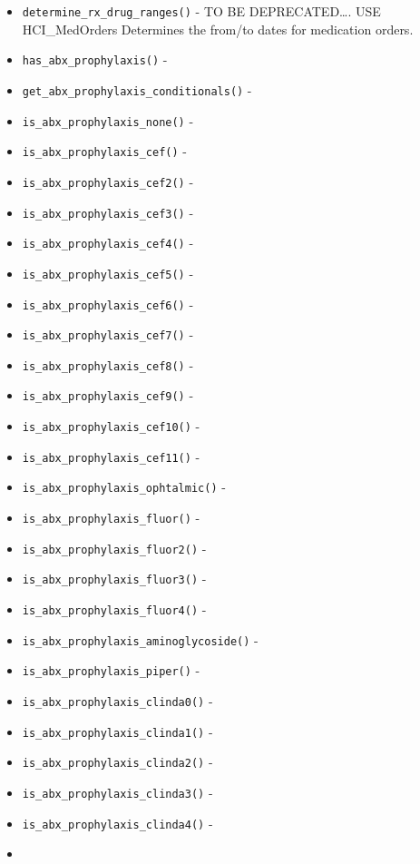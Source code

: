 \documentclass[
]{book}
\providecommand{\tightlist}{%
  \setlength{\itemsep}{0pt}\setlength{\parskip}{0pt}}
\begin{document}
\begin{itemize}
\tightlist
\item
  \texttt{determine\_rx\_drug\_ranges()} - TO BE DEPRECATED\ldots. USE HCI\_MedOrders Determines the from/to dates for medication orders.
\item
  \texttt{has\_abx\_prophylaxis()} -
\item
  \texttt{get\_abx\_prophylaxis\_conditionals()} -
\item
  \texttt{is\_abx\_prophylaxis\_none()} -
\item
  \texttt{is\_abx\_prophylaxis\_cef()} -
\item
  \texttt{is\_abx\_prophylaxis\_cef2()} -
\item
  \texttt{is\_abx\_prophylaxis\_cef3()} -
\item
  \texttt{is\_abx\_prophylaxis\_cef4()} -
\item
  \texttt{is\_abx\_prophylaxis\_cef5()} -
\item
  \texttt{is\_abx\_prophylaxis\_cef6()} -
\item
  \texttt{is\_abx\_prophylaxis\_cef7()} -
\item
  \texttt{is\_abx\_prophylaxis\_cef8()} -
\item
  \texttt{is\_abx\_prophylaxis\_cef9()} -
\item
  \texttt{is\_abx\_prophylaxis\_cef10()} -
\item
  \texttt{is\_abx\_prophylaxis\_cef11()} -
\item
  \texttt{is\_abx\_prophylaxis\_ophtalmic()} -
\item
  \texttt{is\_abx\_prophylaxis\_fluor()} -
\item
  \texttt{is\_abx\_prophylaxis\_fluor2()} -
\item
  \texttt{is\_abx\_prophylaxis\_fluor3()} -
\item
  \texttt{is\_abx\_prophylaxis\_fluor4()} -
\item
  \texttt{is\_abx\_prophylaxis\_aminoglycoside()} -
\item
  \texttt{is\_abx\_prophylaxis\_piper()} -
\item
  \texttt{is\_abx\_prophylaxis\_clinda0()} -
\item
  \texttt{is\_abx\_prophylaxis\_clinda1()} -
\item
  \texttt{is\_abx\_prophylaxis\_clinda2()} -
\item
  \texttt{is\_abx\_prophylaxis\_clinda3()} -
\item
  \texttt{is\_abx\_prophylaxis\_clinda4()} -
\item

\end{itemize}
\end{document}
